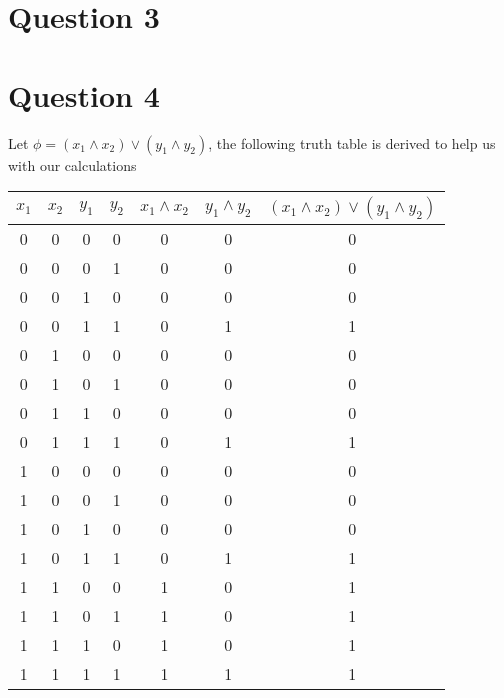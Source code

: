 \documentclass[a4paper,10pt]{article}
\begin{document}
\newpage
\section*{Question 3}
\newpage
\section*{Question 4}
Let $\phi = (x_1 \wedge x_2) \vee (y_1 \wedge y_2) $, the following truth table is derived to help us with our calculations

\begin{center}
 
\begin{tabular}{|c|c|c|c|c|c|c|}
\hline
$x_1$ & $x_2$ & $y_1$ & $y_2$ & $x_1 \wedge x_2 $ & $y_1 \wedge y_2$ & $(x_1 \wedge x_2) \vee (y_1 \wedge y_2)$ \\
\hline
0 & 0 & 0 & 0 & 0 & 0 & 0 \\
0 & 0 & 0 & 1 & 0 & 0 & 0 \\
0 & 0 & 1 & 0 & 0 & 0 & 0 \\
0 & 0 & 1 & 1 & 0 & 1 & 1 \\
0 & 1 & 0 & 0 & 0 & 0 & 0 \\
0 & 1 & 0 & 1 & 0 & 0 & 0 \\
0 & 1 & 1 & 0 & 0 & 0 & 0 \\
0 & 1 & 1 & 1 & 0 & 1 & 1 \\
1 & 0 & 0 & 0 & 0 & 0 & 0 \\
1 & 0 & 0 & 1 & 0 & 0 & 0 \\
1 & 0 & 1 & 0 & 0 & 0 & 0 \\
1 & 0 & 1 & 1 & 0 & 1 & 1 \\
1 & 1 & 0 & 0 & 1 & 0 & 1 \\
1 & 1 & 0 & 1 & 1 & 0 & 1 \\
1 & 1 & 1 & 0 & 1 & 0 & 1 \\
1 & 1 & 1 & 1 & 1 & 1 & 1 \\

\hline
\end{tabular}

\end{center}
\end{document}
